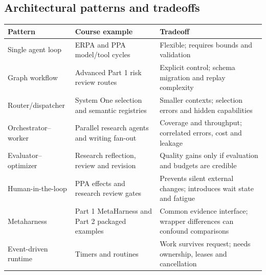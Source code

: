 \documentclass[11pt,letterpaper]{article}
\begin{document}
\subsection{Architectural patterns and tradeoffs}
\begin{longtable}{>{\raggedright\arraybackslash}p{.24\linewidth}>{\raggedright\arraybackslash}p{.32\linewidth}>{\raggedright\arraybackslash}p{.36\linewidth}}\toprule
Pattern & Course example & Tradeoff \\\midrule\endhead
Single agent loop & ERPA and PPA model/tool cycles & Flexible; requires bounds and validation \\
Graph workflow & Advanced Part 1 risk review routes & Explicit control; schema migration and replay complexity \\
Router/dispatcher & System One selection and semantic registries & Smaller contexts; selection errors and hidden capabilities \\
Orchestrator--worker & Parallel research agents and writing fan-out & Coverage and throughput; correlated errors, cost and leakage \\
Evaluator--optimizer & Research reflection, review and revision & Quality gains only if evaluation and budgets are credible \\
Human-in-the-loop & PPA effects and research review gates & Prevents silent external changes; introduces wait state and fatigue \\
Metaharness & Part 1 MetaHarness and Part 2 packaged examples & Common evidence interface; wrapper differences can confound comparisons \\
Event-driven runtime & Timers and routines & Work survives request; needs ownership, leases and cancellation \\
\bottomrule\end{longtable}
\end{document}
